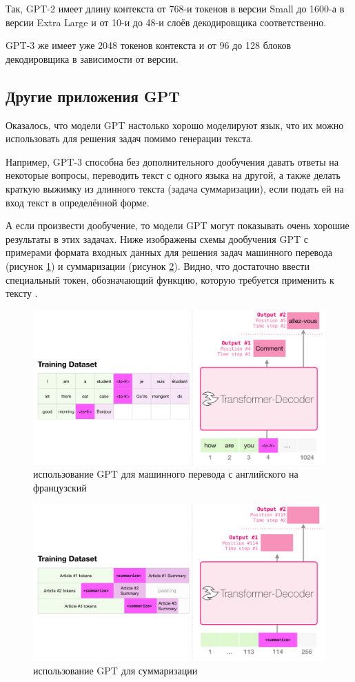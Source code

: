 Так, GPT-2 имеет длину контекста от 768-и токенов в версии Small до 1600-а в версии Extra Large и от 10-и до 48-и слоёв декодировщика соответственно.

GPT-3 же имеет уже 2048 токенов контекста и от 96 до 128 блоков декодировщика в зависимости от версии.

\subsection{Другие приложения GPT}

Оказалось, что модели GPT настолько хорошо моделируют язык, что их можно использовать для решения задач помимо генерации текста.

Например, GPT-3 способна без дополнительного дообучения давать ответы на некоторые вопросы, переводить текст с одного языка на другой, а также делать краткую выжимку из длинного текста (задача суммаризации), если подать ей на вход текст в определённой форме.

А если произвести дообучение, то модели GPT могут показывать очень хорошие результаты в этих задачах. Ниже изображены схемы дообучения GPT с примерами формата входных данных для решения задач машинного перевода (рисунок \ref*{fig:gpt_translation}) и суммаризации (рисунок \ref*{fig:gpt_summarization}). Видно, что достаточно ввести специальный токен, обозначающий функцию, которую требуется применить к тексту \cite{art:gpt3}.

\begin{figure}[h]
    \centering
    \includegraphics[width=\textwidth]{../inc/images/gpt-translation.png}
    \caption{использование GPT для машинного перевода с английского на французский}
    \label{fig:gpt_translation}
\end{figure}

\begin{figure}[h]
    \centering
    \includegraphics[width=\textwidth]{../inc/images/gpt-summarization.png}
    \caption{использование GPT для суммаризации}
    \label{fig:gpt_summarization}
\end{figure}

